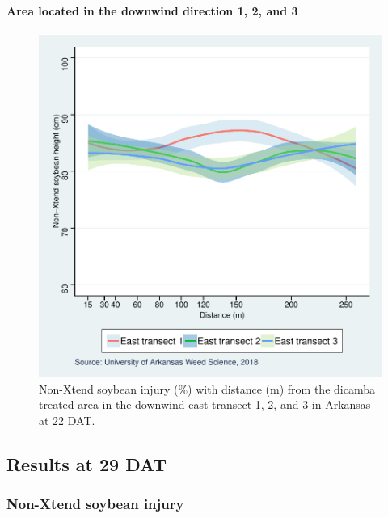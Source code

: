 \documentclass[]{article}
\let\oldparagraph\paragraph
\renewcommand{\paragraph}[1]{\oldparagraph{#1}\mbox{}}
\begin{document}
\paragraph{\texorpdfstring{Area located in the \textbf{downwind}
direction 1, 2, and
3}{Area located in the downwind direction 1, 2, and 3}}\label{area-located-in-the-downwind-direction-1-2-and-3}

\begin{figure}
\centering
\includegraphics{Report_files/figure-latex/unnamed-chunk-19-1.pdf}
\caption{Non-Xtend soybean injury (\%) with distance (m) from the
dicamba treated area in the downwind east transect 1, 2, and 3 in
Arkansas at 22 DAT.}
\end{figure}

\pagebreak
\newpage

\subsection{Results at 29 DAT}\label{results-at-29-dat}

\subsubsection{Non-Xtend soybean
injury}\label{non-xtend-soybean-injury-1}
\end{document}
